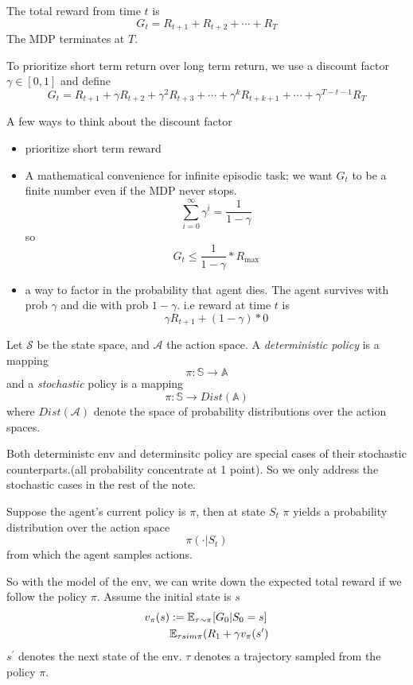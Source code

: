 \documentclass{article}
\begin{document}
The total reward from time $t$ is 
\[
    G_t = R_{t+1} + R_{t+2} + \cdots + R_{T}
\]
The MDP terminates at $T$. 

To prioritize short term return over long term return, we use a 
discount factor $\gamma \in [0, 1]$ and define
\[
    G_t = R_{t+1} + \gamma R_{t+2} + \gamma^2 R_{t+3} + \cdots 
    + \gamma^k R_{t+k+1} + \cdots + \gamma^{T-t-1}R_{T}
\]

A few ways to think about the discount factor
\begin{itemize}
    \item prioritize short term reward
    \item A mathematical convenience for infinite episodic task; we 
        want $G_t$ to be a finite number even if the MDP never stops.
        \[
            \sum_{i=0}^{\infty} \gamma^i = \frac{1}{1-\gamma}
        \]
        so 
        \[
            G_t \le \frac{1}{1-\gamma} * R_{\max}
        \]
    \item a way to factor in the probability that agent dies. The agent 
        survives with prob $\gamma$ and die with prob $1 - \gamma$.
        i.e reward at time $t$ is 
        \[
            \gamma R_{t+1} + (1 - \gamma) * 0
        \]
\end{itemize}

Let $\mathscr{S}$ be the state space, and $\mathscr{A}$ the action space.
A \emph{deterministic policy} is a mapping 
\[
    \pi: \mathbb{S} \rightarrow \mathbb{A}
\]
and a \emph{stochastic} policy is a mapping
\[
    \pi: \mathbb{S} \rightarrow Dist( \mathbb{A} )
\]
where $Dist(\mathscr{ A })$ denote the space of probability distributions
over the action spaces.

Both deterministc env and determinsitc policy are special cases of their
stochastic counterparts.(all probability concentrate at 1 point). So 
we only address the stochastic cases in the rest of the note.

Suppose the agent's current policy is $\pi$, then at state $S_t$
$\pi$ yields a probability distribution over the action space
\[
    \pi(\cdot | S_t)
\]
from which the agent samples actions. 

So with the model of the env, we can write down the expected total 
reward if we follow the policy $\pi$. Assume the initial state is $s$
\begin{align}
    v_{\pi}(s) & := \mathbb{E}_{\tau \sim \pi}[G_0 | S_0 = s] \\
        & \mathbb{E}_{\tau sim \pi}(R_1 + \gamma v_{\pi}(s^{\prime}) 
\end{align}
$s^{\prime}$ denotes the next state of the env.
$\tau$ denotes a trajectory sampled from the policy $\pi$.
\end{document}
